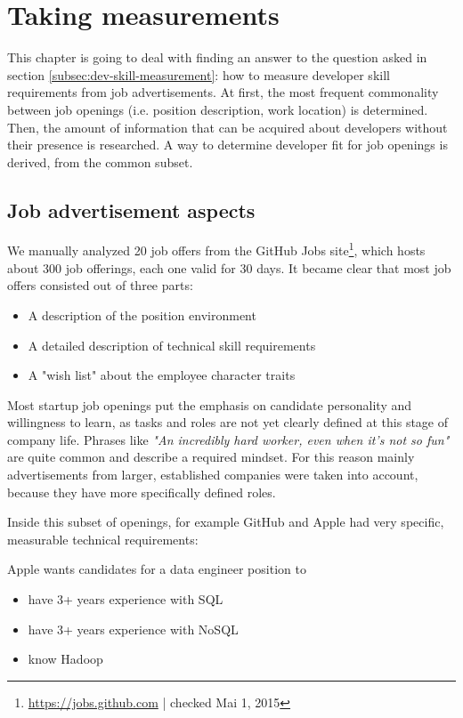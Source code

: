 \chapter{Taking measurements}
This chapter is going to deal with finding an answer to the question asked in section \ref{subsec:dev-skill-measurement}: how to measure developer skill requirements from job advertisements.
At first, the most frequent commonality between job openings (i.e.  position description, work location) is determined. Then, the amount of information that can be acquired about developers without their presence is researched. A way to determine developer fit for job openings is derived, from the common subset.

\section{Job advertisement aspects}
We manually analyzed 20 job offers from the GitHub Jobs site\footnote{\url{https://jobs.github.com} | checked Mai 1, 2015}, which hosts about 300 job offerings, each one valid for 30 days. It became clear that most job offers consisted out of three parts:

\begin{itemize}
  \item A description of the position environment
  \item A detailed description of technical skill requirements
  \item A "wish list" about the employee character traits
\end{itemize}

Most startup job openings put the emphasis on candidate personality and willingness to learn, as tasks and roles are not yet clearly defined at this stage of company life. Phrases like \textit{"An incredibly hard worker, even when it's not so fun"} are quite common and describe a required mindset. For this reason mainly advertisements from larger, established  companies were taken into account, because they have more specifically defined roles.

Inside this subset of openings, for example GitHub and Apple had very specific, measurable technical requirements:
\newline

Apple wants candidates for a data engineer position to
\begin{itemize}
    \item have 3+ years experience with SQL
    \item have 3+ years experience with NoSQL
    \item know Hadoop
\end{itemize}

